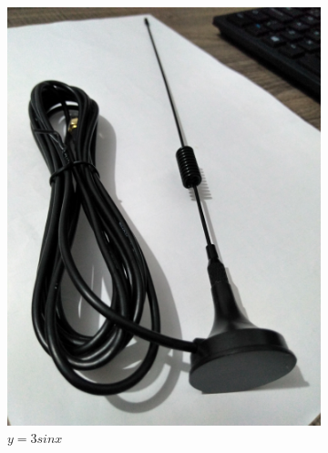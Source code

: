 \documentclass[
  12pt,				%
  openright,			%
  twoside,			%
  a4paper,			%
  english,			%
  french,				%
  spanish,			%
  brazil,				%
  ]{abntex2}
\begin{document}
\begin{figure}[!htb]
\begin{subfigure}[b]{0.45\linewidth}
    \includegraphics[width=\linewidth]{figures/hackrf/hack_rf_antena_helicoidal.jpg}
    \caption{$y=3sinx$}
    \label{fig:hack_rf_antena_helicoidal}
  \end{subfigure}
  \quad
  \begin{subfigure}[b]{0.45\linewidth}
    \centering

\end{subfigure}
\end{figure}
\end{document}
